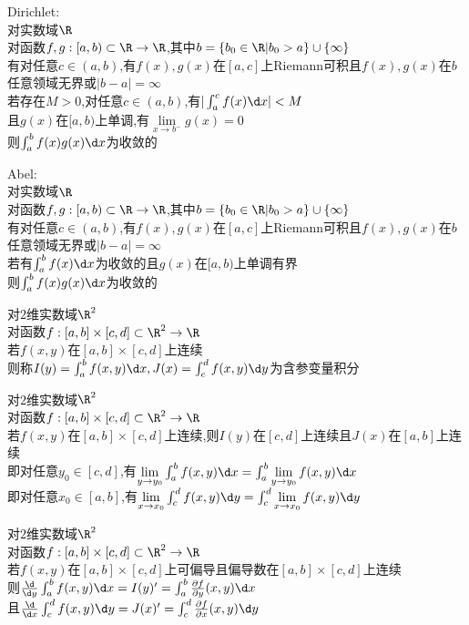 \begin{dingli}
Dirichlet:\\
对实数域$\R$\\
对函数$f,g:[a,b)\subset \R \to \R$,其中$b=\{b_0\in\R|b_0>a\}\cup\{\infty\}$\\
有对任意$c\in(a,b)$,有$f(x),g(x)$在$[a,c]$上Riemann可积且$f(x),g(x)$在$b$任意领域无界或$|b-a|=\infty$\\
若存在$M>0$,对任意$c\in(a,b)$,有$|\int_{a}^{c}f(x)\d x|<M$\\
且$g(x)$在$[a,b)$上单调,有$\lim\limits_{x\to b^{-}}g(x)=0$\\
则$\int_{a}^{b}f(x)g(x)\d x$为收敛的
\end{dingli}

\begin{dingli}
Abel:\\
对实数域$\R$\\
对函数$f,g:[a,b)\subset \R \to \R$,其中$b=\{b_0\in\R|b_0>a\}\cup\{\infty\}$\\
有对任意$c\in(a,b)$,有$f(x),g(x)$在$[a,c]$上Riemann可积且$f(x),g(x)$在$b$任意领域无界或$|b-a|=\infty$\\
若有$\int_{a}^{b}f(x)\d x$为收敛的且$g(x)$在$[a,b)$上单调有界\\
则$\int_{a}^{b}f(x)g(x)\d x$为收敛的
\end{dingli}

\begin{dingyi}
对$2$维实数域$\R^2$\\
对函数$f:[a,b]\times[c,d]\subset \R^2 \to \R$\\
若$f(x,y)$在$[a,b]\times[c,d]$上连续\\
则称$I(y)=\int_{a}^{b}f(x,y)\d x,J(x)=\int_{c}^{d}f(x,y)\d y$为含参变量积分
\end{dingyi}

\begin{dingli}
对$2$维实数域$\R^2$\\
对函数$f:[a,b]\times[c,d]\subset \R^2 \to \R$\\
若$f(x,y)$在$[a,b]\times[c,d]$上连续,则$I(y)$在$[c,d]$上连续且$J(x)$在$[a,b]$上连续\\
即对任意$y_0\in [c,d]$,有$\lim\limits_{y\to y_0}\int_{a}^{b}f(x,y)\d x=\int_{a}^{b}\lim\limits_{y\to y_0}f(x,y)\d x$\\
即对任意$x_0\in [a,b]$,有$\lim\limits_{x\to x_0}\int_{c}^{d}f(x,y)\d y=\int_{c}^{d}\lim\limits_{x\to x_0}f(x,y)\d y$
\end{dingli}

\begin{dingli}
对$2$维实数域$\R^2$\\
对函数$f:[a,b]\times[c,d]\subset \R^2 \to \R$\\
若$f(x,y)$在$[a,b]\times[c,d]$上可偏导且偏导数在$[a,b]\times[c,d]$上连续\\
则$\frac{\d}{\d y}\int_{a}^{b}f(x,y)\d x=I(y)'=\int_{a}^{b}\frac{\partial f}{\partial y}(x,y)\d x$\\
且$\frac{\d}{\d x}\int_{c}^{d}f(x,y)\d y=J(x)'=\int_{c}^{d}\frac{\partial f}{\partial x}(x,y)\d y$
\end{dingli}

